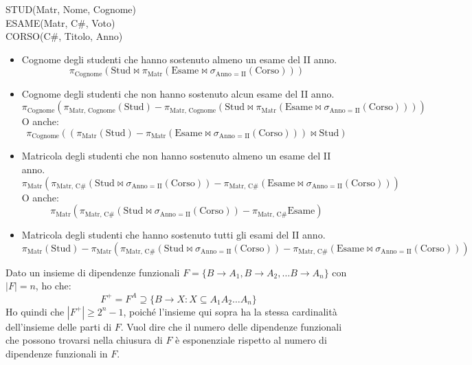 \begin{esercizio}
STUD(Matr, Nome, Cognome) \\
ESAME(Matr, C\#, Voto) \\
CORSO(C\#, Titolo, Anno)

\begin{itemize}
    \item Cognome degli studenti che hanno sostenuto almeno un esame del II anno.
    \[
    \pi_{\text{Cognome}}(\text{Stud} \Join \pi_{\text{Matr}}(\text{Esame} \Join \sigma_{\text{Anno = II}}(\text{Corso})))
    \]
    \item Cognome degli studenti che non hanno sostenuto alcun esame del II anno.
    \[
    \pi_{\text{Cognome}}(\pi_{\text{Matr, Cognome}}(\text{Stud}) - \pi_{\text{Matr, Cognome}}(\text{Stud} \Join \pi_{\text{Matr}}(\text{Esame} \Join \sigma_{\text{Anno = II}}(\text{Corso}))))
    \]
    O anche:
    \[
    \pi_{\text{Cognome}} \left( \left( \pi_{\text{Matr}} \left( \text{Stud} \right) - \pi_{\text{Matr}} \left(\text{Esame} \Join \sigma_{\text{Anno = II}} \left(\text{Corso} \right) \right) \right) \Join \text{Stud} \right)
    \]
    \item Matricola degli studenti che non hanno sostenuto almeno un esame del II anno.
    \[
    \pi_{\text{Matr}} \left(
    \pi_{\text{Matr, C\#}}(\text{Stud} \Join \sigma_{\text{Anno = II}}(\text{Corso})) - \pi_{\text{Matr, C\#}} (\text{Esame} \Join \sigma_{\text{Anno = II}}(\text{Corso}) )
    \right)
    \]
    O anche:
    \[
    \pi_{\text{Matr}} \left(
    \pi_{\text{Matr, C\#}}(\text{Stud} \Join \sigma_{\text{Anno = II}}(\text{Corso})) - \pi_{\text{Matr, C\#}} \text{Esame}
    \right)
    \]
    \item Matricola degli studenti che hanno sostenuto tutti gli esami del II anno.
    \[
    \pi_{\text{Matr}} (\text{Stud}) - 
    \pi_{\text{Matr}} \left(
    \pi_{\text{Matr, C\#}}(\text{Stud} \Join \sigma_{\text{Anno = II}}(\text{Corso})) - \pi_{\text{Matr, C\#}} (\text{Esame} \Join \sigma_{\text{Anno = II}}(\text{Corso}) )
    \right)
    \]
\end{itemize}
\end{esercizio}

Dato un insieme di dipendenze funzionali $F = \{ B \to A_1, B \to A_2, \dots  B \to A_n \}$ con $|F| = n$, ho che:
\[
F^+ = F^A \supseteq \{ B \to X : X \subseteq A_1 A_2 \dots A_n \}
\]
Ho quindi che $|F^+| \ge 2^{n} - 1$, poich\'e l'insieme qui sopra ha la stessa cardinalit\`a dell'insieme delle parti di $F$. Vuol dire che il numero delle dipendenze funzionali che possono trovarsi nella chiusura di $F$ \`e esponenziale rispetto al numero di dipendenze funzionali in $F$.

